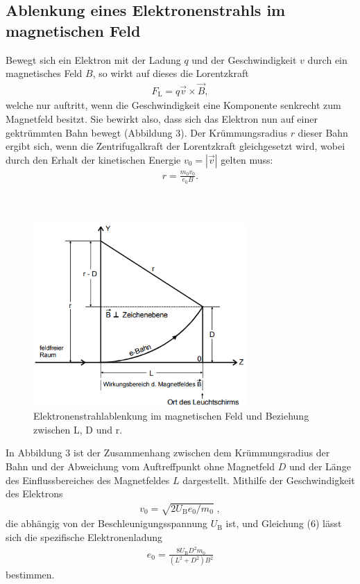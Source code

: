\subsection{Ablenkung eines Elektronenstrahls im magnetischen Feld}
Bewegt sich ein Elektron mit der Ladung $q$ und der Geschwindigkeit $v$ durch ein magnetisches Feld $B$, so
wirkt auf dieses die Lorentzkraft
\begin{align}
F_\text{L} = q \vec{v} \times \vec{B},
\end{align}
welche nur auftritt, wenn die Geschwindigkeit eine Komponente senkrecht zum Magnetfeld besitzt.
Sie bewirkt also, dass sich das Elektron nun auf einer gektrümmten Bahn bewegt (Abbildung 3).
Der Krümmungsradius $r$ dieser Bahn ergibt sich, wenn die Zentrifugalkraft der Lorentzkraft gleichgesetzt
wird, wobei durch den Erhalt der kinetischen Energie $v_\text{0} = |\vec{v}|$ gelten muss:
\begin{align}
r = \frac{m_\text{0} v_\text{0}}{e_\text{0}B}.
\end{align}
\\~\\
\begin{figure}
  \centering
  \includegraphics[height=7cm]{ablenkung2.png}
  \caption{Elektronenstrahlablenkung im magnetischen Feld und Beziehung zwischen L, D und r. \cite[S.2]{kent2}}
\end{figure}
In Abbildung 3 ist der Zusammenhang zwischen dem Krümmungsradius der Bahn und der Abweichung
vom Auftreffpunkt ohne Magnetfeld $D$ und der Länge des Einflussbereiches des Magnetfeldes $L$
dargestellt.
Mithilfe der Geschwindigkeit des Elektrons 
\begin{align*}
v_\text{0} = \sqrt{2U_\text{B} e_\text{0} / m_\text{0}}\;,
\end{align*} die abhängig von der Beschleunigungsspannung $U_\text{B}$ ist, und Gleichung (6)
lässt sich die spezifische Elektronenladung
\begin{align}
e_\text{0} = \frac{8 U_\text{B} D^{2} m_\text{0}}{(L^{2} + D^{2})B^{2}}
\end{align}
bestimmen.
